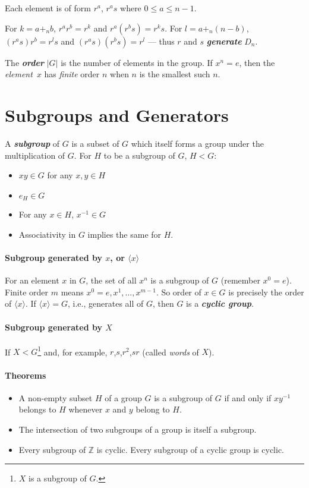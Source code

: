 \documentclass[a4paper,twocolumn,10pt]{article}
\begin{document}
  Each element is of form $r^a$, $r^as$ where $0\leqslant a\leqslant n-1$.

  For $k=a+_nb$, $r^ar^b=r^k$ and $r^a(r^bs)=r^ks$.  For $l=a+_n(n-b)$,
  $(r^as)r^b=r^ls$ and $(r^as)(r^bs)=r^l$ --- thus $r$ and $s$
  \textbf{\textit{generate}} $D_n$.

  The \textbf{\textit{order}} $|G|$ is the number of elements in the group. If
  $x^n=e$, then the \textit{element} $x$ has \textit{finite} order $n$ when $n$
  is the smallest such $n$.

  \section{Subgroups and Generators}
  A \textbf{\textit{subgroup}} of $G$ is a subset of $G$ which itself forms a
  group under the multiplication of $G$. For $H$ to be a subgroup of $G$,
  $H<G$:
  \begin{itemize}
    \item $xy \in G$ for any $x,y \in H$
    \item $e_H \in G$
    \item For any $x \in H$, $x^{-1} \in G$
    \item Associativity in $G$ implies the same for $H$.
  \end{itemize}

  \paragraph{Subgroup generated by $x$, or $\langle x \rangle$}
  For an element $x$ in $G$, the set of all $x^n$ is a subgroup of $G$
  (remember $x^0=e$). Finite order $m$ means $x^0=e, x^1, \ldots, x^{m-1}$.
  So order of $x\in G$ is precisely the order of $\langle x\rangle$. If
  $\langle x\rangle=G$, i.e., generates all of $G$, then $G$ is a
  \textbf{\textit{cyclic group}}.

  \paragraph{Subgroup generated by $X$} If $X<G$\footnote{$X$ is a subgroup of
  $G$.} and, for example, $r$,$s$,$r^2$,$sr$ (called \textit{words} of $X$).

  \paragraph{Theorems}
  \begin{itemize}[leftmargin=0.45in]
    \item[\theorem{5.1}] A non-empty subset $H$ of a group $G$ is a subgroup of
      $G$ if and only if $xy^{-1}$ belongs to $H$ whenever $x$ and $y$ belong
      to $H$.

    \item[\theorem{5.2}] The intersection of two subgroups of a group is itself
      a subgroup.

    \item[\theorem{5.3}] Every subgroup of $\mathbb{Z}$ is cyclic. Every
      subgroup of a cyclic group is cyclic.
  \end{itemize}
\end{document}
